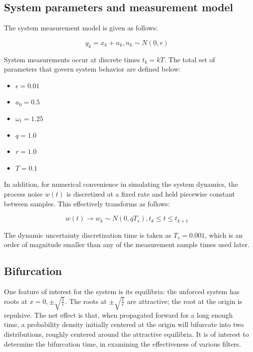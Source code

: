 \documentclass[]{article}
\begin{document}
\subsection{System parameters and measurement model}

The system measurement model is given as follows:

\begin{equation}
y_k = x_k + n_k, n_k \sim N(0,r)
\end{equation}

System measurements occur at discrete times $t_k = kT$. The total set of parameters that govern system behavior are defined below:

\begin{itemize}
\item $\epsilon = 0.01$
\item $a_0 = 0.5$
\item $\omega_t = 1.25$
\item $q = 1.0$
\item $r = 1.0$
\item $T = 0.1$
\end{itemize}

In addition, for numerical convenience in simulating the system dynamics, the process noise $w(t)$ is discretized at a fixed rate and held piecewise constant between samples. This effectively transforms as follows:

\begin{equation}
w(t) \rightarrow w_k \sim N(0,qT_s), t_k \leq t \leq t_{k+1}
\end{equation}

The dynamic uncertainty discretization time is taken as $T_s = 0.001$, which is an order of magnitude smaller than any of the measurement sample times used later.

\subsection{Bifurcation}

One feature of interest for the system is its equilibria: the unforced system has roots at $x = 0, \pm \sqrt{\frac{1}{\epsilon}}$. The roots at $\pm \sqrt{\frac{1}{\epsilon}}$ are attractive; the root at the origin is repulsive. The net effect is that, when propagated forward for a long enough time, a probability density initially centered at the origin will bifurcate into two distributions, roughly centered around the attractive equilibria. It is of interest to determine the bifurcation time, in examining the effectiveness of various filters.
\end{document}
